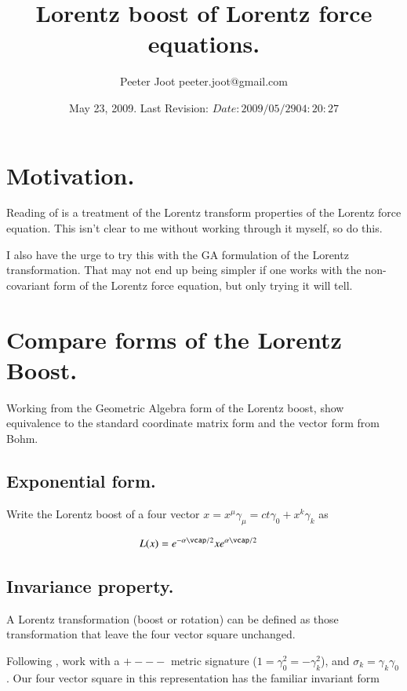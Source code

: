 \documentclass{article}
\title{ Lorentz boost of Lorentz force equations. }
\author{Peeter Joot \quad peeter.joot@gmail.com }
\date{ May 23, 2009.  Last Revision: $Date: 2009/05/29 04:20:27 $ }
\begin{document}
\maketitle{}
\tableofcontents
\section{ Motivation. }

Reading of \cite{bohm1996str} is a treatment of the Lorentz transform
properties of the Lorentz force equation.  This isn't clear to me
without working through it myself, so do this.

I also have the urge to 
try this with the GA formulation of the Lorentz transformation.  That may not end up being simpler
if one works with the non-covariant form of the Lorentz force equation, but only trying it will tell.

\section{ Compare forms of the Lorentz Boost. }

Working from the Geometric Algebra form of the Lorentz boost, show equivalence to the standard
coordinate matrix form and the vector form from Bohm.

\subsection{ Exponential form. }

Write the Lorentz boost of a four vector $x = x^\mu \gamma_\mu = ct \gamma_0 + x^k \gamma_k$ as

\begin{align}\label{eqn:LorentzBoost}
L(x) &= 
e^{-\alpha \vcap/2}
x
e^{\alpha \vcap/2}
\end{align}

\subsection{ Invariance property. }

A Lorentz transformation (boost or rotation) can be defined as those transformation that leave the four vector square unchanged.

Following \cite{doran2003gap}, work with a $+---$ metric signature ($1 = \gamma_0^2 = -\gamma_k^2$), and $\sigma_k = \gamma_k \gamma_0$.  Our four vector square in this representation has the familiar invariant form
\end{document}
